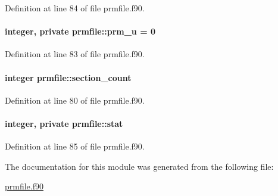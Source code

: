 Definition at line 84 of file prmfile.\-f90.

\hypertarget{classprmfile_a4be6bdd367c302a55faff15cc66a4dd7}{
\paragraph[{prm\-\_\-u}]{\setlength{\rightskip}{0pt plus 5cm}integer, private prmfile\-::prm\-\_\-u = 0\hspace{0.3cm}{\ttfamily [private]}}}\label{classprmfile_a4be6bdd367c302a55faff15cc66a4dd7}


Definition at line 83 of file prmfile.\-f90.

\hypertarget{classprmfile_a013c6ccd83e5058a2ccf707b491b4fde}{
\paragraph[{section\-\_\-count}]{\setlength{\rightskip}{0pt plus 5cm}integer prmfile\-::section\-\_\-count}}\label{classprmfile_a013c6ccd83e5058a2ccf707b491b4fde}


Definition at line 80 of file prmfile.\-f90.

\hypertarget{classprmfile_accd9729a3cd7a0f6aa6f93db46e0557c}{
\paragraph[{stat}]{\setlength{\rightskip}{0pt plus 5cm}integer, private prmfile\-::stat\hspace{0.3cm}{\ttfamily [private]}}}\label{classprmfile_accd9729a3cd7a0f6aa6f93db46e0557c}


Definition at line 85 of file prmfile.\-f90.



The documentation for this module was generated from the following file\-:\begin{DoxyCompactItemize}
\item 
\hyperlink{prmfile_8f90}{prmfile.\-f90}\end{DoxyCompactItemize}
